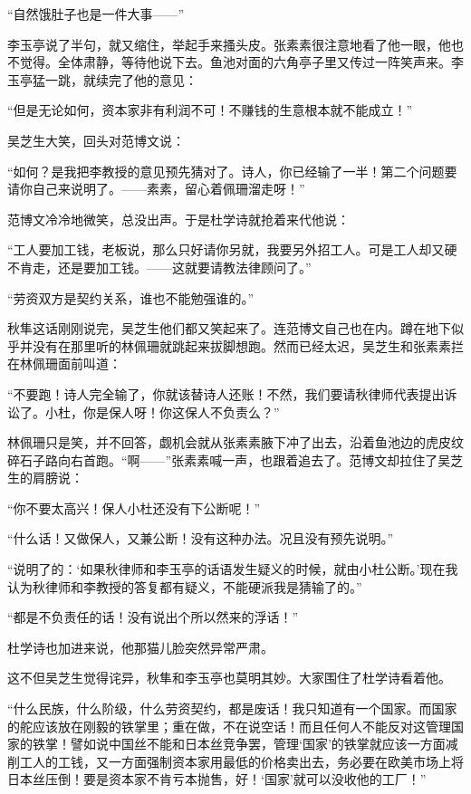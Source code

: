 \par “自然饿肚子也是一件大事——”
\par 李玉亭说了半句，就又缩住，举起手来搔头皮。张素素很注意地看了他一眼，他也不觉得。全体肃静，等待他说下去。鱼池对面的六角亭子里又传过一阵笑声来。李玉亭猛一跳，就续完了他的意见：
\par “但是无论如何，资本家非有利润不可！不赚钱的生意根本就不能成立！”
\par 吴芝生大笑，回头对范博文说：
\par “如何？是我把李教授的意见预先猜对了。诗人，你已经输了一半！第二个问题要请你自己来说明了。——素素，留心着佩珊溜走呀！”
\par 范博文冷冷地微笑，总没出声。于是杜学诗就抢着来代他说：
\par “工人要加工钱，老板说，那么只好请你另就，我要另外招工人。可是工人却又硬不肯走，还是要加工钱。——这就要请教法律顾问了。”
\par “劳资双方是契约关系，谁也不能勉强谁的。”
\par 秋隼这话刚刚说完，吴芝生他们都又笑起来了。连范博文自己也在内。蹲在地下似乎并没有在那里听的林佩珊就跳起来拔脚想跑。然而已经太迟，吴芝生和张素素拦在林佩珊面前叫道：
\par “不要跑！诗人完全输了，你就该替诗人还账！不然，我们要请秋律师代表提出诉讼了。小杜，你是保人呀！你这保人不负责么？”
\par 林佩珊只是笑，并不回答，觑机会就从张素素腋下冲了出去，沿着鱼池边的虎皮纹碎石子路向右首跑。“啊——”张素素喊一声，也跟着追去了。范博文却拉住了吴芝生的肩膀说：
\par “你不要太高兴！保人小杜还没有下公断呢！”
\par “什么话！又做保人，又兼公断！没有这种办法。况且没有预先说明。”
\par “说明了的：‘如果秋律师和李玉亭的话语发生疑义的时候，就由小杜公断。’现在我认为秋律师和李教授的答复都有疑义，不能硬派我是猜输了的。”
\par “都是不负责任的话！没有说出个所以然来的浮话！”
\par 杜学诗也加进来说，他那猫儿脸突然异常严肃。
\par 这不但吴芝生觉得诧异，秋隼和李玉亭也莫明其妙。大家围住了杜学诗看着他。
\par “什么民族，什么阶级，什么劳资契约，都是废话！我只知道有一个国家。而国家的舵应该放在刚毅的铁掌里；重在做，不在说空话！而且任何人不能反对这管理国家的铁掌！譬如说中国丝不能和日本丝竞争罢，管理‘国家’的铁掌就应该一方面减削工人的工钱，又一方面强制资本家用最低的价格卖出去，务必要在欧美市场上将日本丝压倒！要是资本家不肯亏本抛售，好！‘国家’就可以没收他的工厂！”
